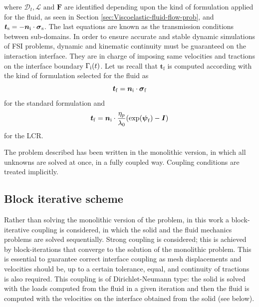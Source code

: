 \documentclass[11pt,english]{article}
\def\sigmafluid{\boldsymbol{\sigma}_{\rm{f}}}
\def\sigmasolid{\boldsymbol{\sigma}_{\rm{s}}}
\def\psifluid{\boldsymbol{\psi}_{\rm{f}}}
\def\boundaryinterface{\Gamma_{\rm{i}}}
\begin{document}
where $\mathcal{\mathcal{D}}_{t},\mathcal{L} \text{ and } \boldsymbol{F}$ are identified depending upon the kind of formulation applied for the fluid, as seen in Section \ref{sec:Viscoelastic-fluid-flow-prob}, and  $\boldsymbol{t}_{\mathrm{s}}= -\boldsymbol{n}_{\mathrm{i}}\cdot\sigmasolid$. The last equations are known as the transmission conditions between sub-domains. In order to ensure accurate and stable dynamic simulations of FSI problems, dynamic and kinematic continuity must be guaranteed on the interaction interface. They are in charge of imposing same velocities and tractions on the interface boundary $\boundaryinterface(t)$. Let us recall that $\boldsymbol{t}_{\mathrm{f}}$ is computed according with the kind of formulation selected for the fluid as
\begin{equation*}
    \boldsymbol{t}_{\mathrm{f}}= \boldsymbol{n}_{\mathrm{i}} \cdot \sigmafluid 
\end{equation*}
for the standard formulation and 
\begin{equation*}
    \boldsymbol{t}_{\mathrm{f}}= \boldsymbol{n}_{\rm{i}}\cdot \dfrac{\eta_p}{\lambda_0}(\exp(\psifluid)-\boldsymbol{I})    
\end{equation*}
for the LCR.

The problem described has been written in the monolithic version, in which all unknowns are solved at once, in a fully coupled way. Coupling conditions are treated implicitly. 

\subsection{Block iterative scheme\label{subsec:iterative_scheme_FSI}}

Rather than solving the monolithic version of the problem, in this work a block-iterative coupling is considered, in which the solid and the fluid mechanics problems are solved sequentially. Strong coupling is considered; this is achieved by block-iterations that converge to the solution of the monolithic problem. This is essential to guarantee correct interface coupling as mesh displacements and velocities should be, up to a certain tolerance, equal, and continuity of tractions is also required. This coupling is of Dirichlet-Neumann type: the solid is solved with the loads computed from the fluid in a given iteration and then the fluid is computed with the velocities on the interface obtained from the solid (see below). 
\end{document}
